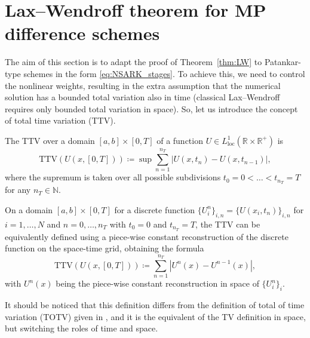 \documentclass[final,11pt, times, linenumber, nopreprintline]{elsarticle}
\newcommand{\TI}[1]{{\color{red}#1}}
\newcommand{\JB}[1]{{\color{orange}#1}}
\newcommand{\DT}[1]{{\color{purple}#1}}
\begin{document}
\section{Lax--Wendroff theorem for MP difference schemes}\label{se_Main}

The aim of this section is to adapt the proof of Theorem~\ref{thm:LW} to Patankar-type schemes in the form \eqref{eq:NSARK_stages}. To achieve this, we need to control the nonlinear weights, resulting in the extra assumption that the numerical solution has a bounded total variation also in time (classical Lax--Wendroff requires only bounded total variation in space).
So, let us introduce the concept of total time variation (TTV). %
\begin{dfn}\label{def:TTV}
    The TTV over a domain $[a,b]\times [0,T]$ of a function $U \in L^1_{\text{loc}}(\mathbb R \times \mathbb R^+)$ is 
    \begin{equation}
        \text{TTV}(U(x,[0,T]))\coloneqq \sup \sum_{n = 1}^{n_T}|U(x,t_n) -U(x,t_{n-1})|,%
    \end{equation}
    where the supremum is taken over all possible subdivisions $t_0=0 <\dots < t_{n_T} = T$ for any $n_T\in \mathbb N$.
\end{dfn}

\begin{rmk}\label{rmk:TTV}
    On a domain $[a,b]\times [0,T]$ for a discrete function $\lbrace U_i^n \rbrace_{i,n}=\{U(x_i,t_n)\}_{i,n}$ for $i=1,\dots,N$ and $n=0,\dots, n_T$ with $t_0=0$ and $t_{n_T}=T$, the TTV can be equivalently defined using a piece-wise constant reconstruction of the discrete function on the space-time grid, obtaining the formula  
    \begin{equation}\label{eq:TTV}
        \text{TTV}(U(x,[0,T]))\coloneqq\sum_{n = 1}^{n_T}|U^{n}(x) -U^{n-1}(x)|,%
    \end{equation}
    with $U^n(x)$ being the piece-wise constant reconstruction in space of $\lbrace U^n_i\rbrace_i$.
\end{rmk}
It should be noticed that this definition differs from the definition of total of time variation (TOTV) given in \cite{toth2023total}, and it is the equivalent of the TV definition in space, but switching the roles of time and space.
\end{document}
